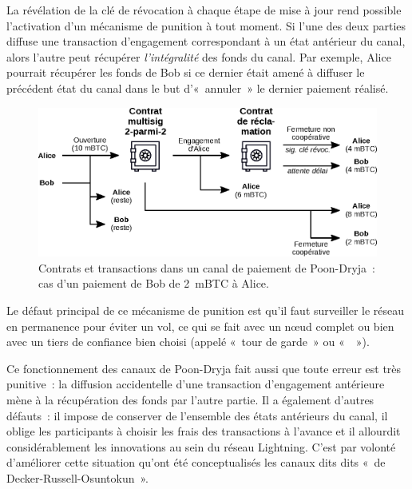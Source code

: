 La révélation de la clé de révocation à chaque étape de mise à jour rend possible l'activation d'un mécanisme de punition à tout moment. Si l'une des deux parties diffuse une transaction d'engagement correspondant à un état antérieur du canal, alors l'autre peut récupérer \emph{l'intégralité} des fonds du canal. Par exemple, Alice pourrait récupérer les fonds de Bob si ce dernier était amené à diffuser le précédent état du canal dans le but d'«~annuler~» le dernier paiement réalisé.

\begin{figure}[ht]
  \centering
  \includegraphics[scale=0.8]{img/lightning-poon-dryja-channel-contracts.eps}
  \caption{Contrats et transactions dans un canal de paiement de Poon-Dryja~: cas d'un paiement de Bob de 2~mBTC à Alice.}
  \label{fig:poon-dryja-contracts}
\end{figure}

Le défaut principal de ce mécanisme de punition est qu'il faut surveiller le réseau en permanence pour éviter un vol, ce qui se fait avec un nœud complet ou bien avec un tiers de confiance bien choisi (appelé «~tour de garde~» ou «~~»).

Ce fonctionnement des canaux de Poon-Dryja fait aussi que toute erreur est très punitive~: la diffusion accidentelle d'une transaction d'engagement antérieure mène à la récupération des fonds par l'autre partie. Il a également d'autres défauts~: il impose de conserver de l'ensemble des états antérieurs du canal, il oblige les participants à choisir les frais des transactions à l'avance et il allourdit considérablement les innovations au sein du réseau Lightning. C'est par volonté d'améliorer cette situation qu'ont été conceptualisés les canaux dits dits «~de Decker-Russell-Osuntokun~».


